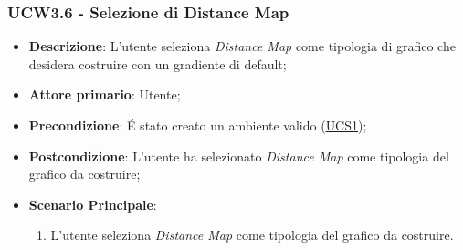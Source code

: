 \subsubsection{UCW3.6 - Selezione di Distance Map}
\label{ssub:ucw3.6}
\begin{itemize}
	\item \textbf{Descrizione}: L’utente seleziona \emph{Distance Map} come tipologia di grafico che desidera
	      costruire con un gradiente di default;
	\item \textbf{Attore primario}:	Utente;
	\item \textbf{Precondizione}:	É stato creato un ambiente valido (\hyperref[sub:ucs1]{UCS1});

	\item \textbf{Postcondizione}:  L'utente ha selezionato \emph{Distance Map} come tipologia del grafico da
	      costruire;

	\item \textbf{Scenario Principale}:
	      \begin{enumerate}
		      \item L'utente seleziona \emph{Distance Map} come tipologia del grafico da costruire.
	      \end{enumerate}
\end{itemize}
